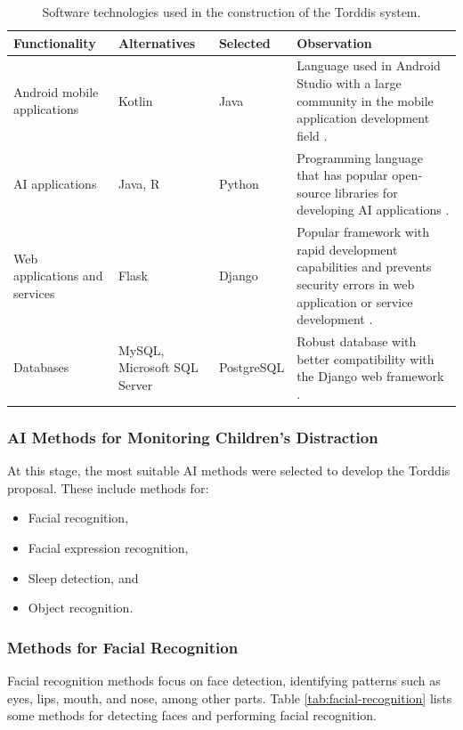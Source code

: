 \documentclass[a4paper,fleqn]{cas-sc}
\begin{document}
					\begin{table}[hbt!]
						\caption{Software technologies used in the construction of the Torddis system.}
						\label{table:software-technologies}
						\centering
						\begin{tabular}{p{}p{0.15\textwidth}p{}p{}}
							\hline
							\multicolumn{1}{l}{\textbf{Functionality}} & \multicolumn{1}{l}{\textbf{Alternatives }} & \multicolumn{1}{l}{\textbf{Selected}} & \multicolumn{1}{l}{\textbf{Observation}} \\ \hline
							Android mobile applications & Kotlin & Java & Language used in Android Studio with a large community in the mobile application development field \citep{Sharma2021Real-Time}. \\
							AI applications & Java, R & Python & Programming language that has popular open-source libraries for developing AI applications \citep{Cai2005OnThePerformance}. \\
							 Web applications and services  & Flask & Django & Popular framework with rapid development capabilities and prevents security errors in web application or service development \citep{Puneet2022ADjango}. \\
							Databases & MySQL, Microsoft SQL Server & PostgreSQL & Robust database with better compatibility with the Django web framework \citep{Puneet2022ADjango}. \\ \hline
						\end{tabular}
					\end{table}
	
				\subsubsection*{AI Methods for Monitoring Children's Distraction}
				
				At this stage, the most suitable AI methods were selected to develop the Torddis proposal. These include methods for:
				\begin{itemize}
					\item Facial recognition,
					\item Facial expression recognition,
					\item Sleep detection, and
					\item Object recognition.
				\end{itemize}
				
				\subsubsection*{Methods for Facial Recognition}
					Facial recognition methods focus on face detection, identifying patterns such as eyes, lips, mouth, and nose, among other parts. Table \ref{tab:facial-recognition} lists some methods for detecting faces and performing facial recognition.
					
\end{document}
